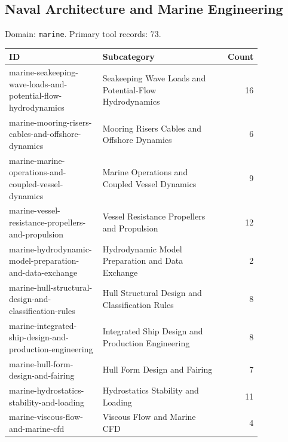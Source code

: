 \subsection{Naval Architecture and Marine Engineering}
\noindent Domain: \texttt{marine}. Primary tool records: 73.
\begin{longtable}{p{0.37\linewidth}p{0.47\linewidth}r}
ID & Subcategory & Count\\\hline\endhead
marine-seakeeping-wave-loads-and-potential-flow-hydrodynamics & Seakeeping Wave Loads and Potential-Flow Hydrodynamics & 16\\
marine-mooring-risers-cables-and-offshore-dynamics & Mooring Risers Cables and Offshore Dynamics & 6\\
marine-marine-operations-and-coupled-vessel-dynamics & Marine Operations and Coupled Vessel Dynamics & 9\\
marine-vessel-resistance-propellers-and-propulsion & Vessel Resistance Propellers and Propulsion & 12\\
marine-hydrodynamic-model-preparation-and-data-exchange & Hydrodynamic Model Preparation and Data Exchange & 2\\
marine-hull-structural-design-and-classification-rules & Hull Structural Design and Classification Rules & 8\\
marine-integrated-ship-design-and-production-engineering & Integrated Ship Design and Production Engineering & 8\\
marine-hull-form-design-and-fairing & Hull Form Design and Fairing & 7\\
marine-hydrostatics-stability-and-loading & Hydrostatics Stability and Loading & 11\\
marine-viscous-flow-and-marine-cfd & Viscous Flow and Marine CFD & 4\\
\end{longtable}
